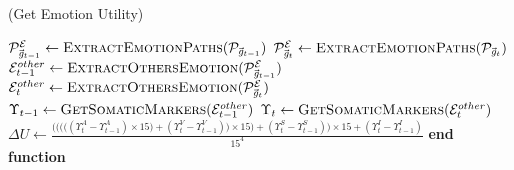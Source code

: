 \documentclass{article}
\begin{document}
\begin{algorithm}
	\caption{(Get Emotion Utility)}
	\label{array-sum}
	\begin{algorithmic}[1]
			\Statex
			\State $\mathcal{P}_{\vec{\mathit{g}}_{t-1}}^{\mathcal{E}} \gets
			\Call{ExtractEmotionPaths} {\mathcal{P}_{\vec{\mathit{g}}_{t-1}}}$
			\State $\mathcal{P}_{\vec{\mathit{g}}_{t}}^\mathcal{E} \gets
			\Call{ExtractEmotionPaths} {\mathcal{P}_{\vec{\mathit{g}}_{t}}}$
			\Statex
			\State $\mathcal{E}_{t-1}^{other} \gets
			\Call{ExtractOthersEmotion}{\mathcal{P}_{\vec{\mathit{g}}_{t-1}}^\mathcal{E}}$
			\State $\mathcal{E}_t^{other} \gets
			\Call{ExtractOthersEmotion}{\mathcal{P}_{\vec{\mathit{g}}_{t}}^\mathcal{E}}$
			\Statex
			\State $\Upsilon_{t-1} \gets
			\Call{GetSomaticMarkers}{\mathcal{E}_{t-1}^{other}}$ 
			\State $\Upsilon_t \gets \Call{GetSomaticMarkers}{\mathcal{E}_t^{other}}$
			\Statex
			\State $\Delta U \gets
			\frac{\Bigg(\bigg(\Big(\big((\Upsilon_{t}^A - \Upsilon_{t-1}^A)\times15\big)
			+ (\Upsilon_{t}^V - \Upsilon_{t-1}^V)\Big)\times15\bigg) + (\Upsilon_{t}^S -
			\Upsilon_{t-1}^S)\Bigg)\times15 + (\Upsilon_{t}^I - \Upsilon_{t-1}^I)}{15^4}$
			\Statex
			\State {} 
		\EndFunction 
	\State \textbf{end function}
	\end{algorithmic}
\end{algorithm}
\end{document}
